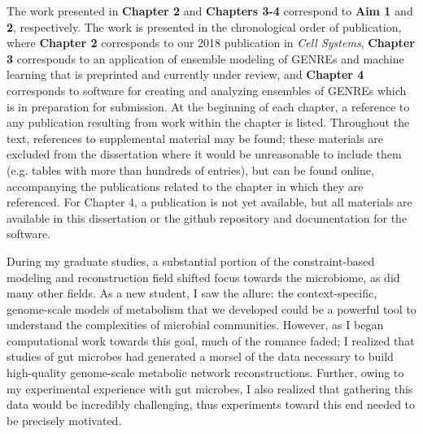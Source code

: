 \documentclass[11pt,onecolumn,notitlepage,openany,twoside]{book}
\begin{document}
\begin{refsection}
The work presented in \textbf{Chapter 2} and \textbf{Chapters 3-4} correspond to \textbf{Aim 1} and \textbf{2}, respectively. The work is presented in the chronological order of publication, where \textbf{Chapter 2} corresponds to our 2018 publication in \textit{Cell Systems}, \textbf{Chapter 3} corresponds to an application of ensemble modeling of GENREs and machine learning that is preprinted and currently under review, and \textbf{Chapter 4} corresponds to software for creating and analyzing ensembles of GENREs which is in preparation for submission. At the beginning of each chapter, a reference to any publication resulting from work within the chapter is listed. Throughout the text, references to supplemental material may be found; these materials are excluded from the dissertation where it would be unreasonable to include them (e.g. tables with more than hundreds of entries), but can be found online, accompanying the publications related to the chapter in which they are referenced. For Chapter 4, a publication is not yet available, but all materials are available in this dissertation or the github repository and documentation for the software.

During my graduate studies, a substantial portion of the constraint-based modeling and reconstruction field shifted focus towards the microbiome, as did many other fields. As a new student, I saw the allure: the context-specific, genome-scale models of metabolism that we developed could be a powerful tool to understand the complexities of microbial communities. However, as I began computational work towards this goal, much of the romance faded; I realized that studies of gut microbes had generated a morsel of the data necessary to build high-quality genome-scale metabolic network reconstructions. Further, owing to my experimental experience with gut microbes, I also realized that gathering this data would be incredibly challenging, thus experiments toward this end needed to be precisely motivated.


\end{refsection}
\end{document}
